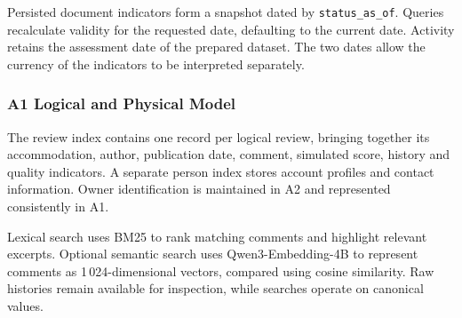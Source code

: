 Persisted document indicators form a snapshot dated by \texttt{status\_\allowbreak{}as\_\allowbreak{}of}. Queries recalculate validity for the requested date, defaulting to the current date. Activity retains the assessment date of the prepared dataset. The two dates allow the currency of the indicators to be interpreted separately.
\subsubsection{A1 Logical and Physical Model}
The review index contains one record per logical review, bringing together its accommodation, author, publication date, comment, simulated score, history and quality indicators. A separate person index stores account profiles and contact information. Owner identification is maintained in A2 and represented consistently in A1.

Lexical search uses BM25 to rank matching comments and highlight relevant excerpts. Optional semantic search uses Qwen3-Embedding-4B to represent comments as 1\,024-dimensional vectors, compared using cosine similarity. Raw histories remain available for inspection, while searches operate on canonical values.
